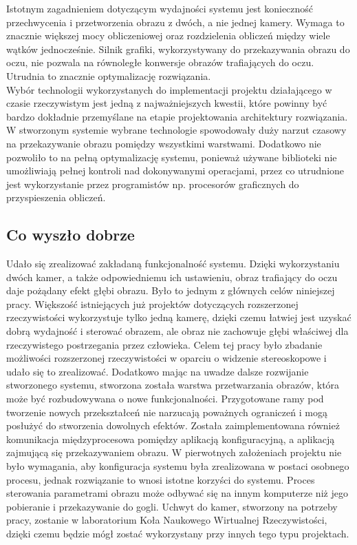 \documentclass[a4paper,11pt,twoside]{report}
\theoremstyle{definition}
\begin{document}
Istotnym zagadnieniem dotyczącym wydajności systemu jest konieczność przechwycenia i przetworzenia obrazu z dwóch, a nie jednej kamery. Wymaga to znacznie większej mocy obliczeniowej oraz rozdzielenia obliczeń między wiele wątków jednocześnie. Silnik grafiki, wykorzystywany do przekazywania obrazu do oczu, nie pozwala na równoległe konwersje obrazów trafiających do oczu. Utrudnia to znacznie optymalizację rozwiązania. \\
Wybór technologii wykorzystanych do implementacji projektu działającego w czasie rzeczywistym jest jedną z najważniejszych kwestii, które powinny być bardzo dokładnie przemyślane na etapie projektowania architektury rozwiązania. W stworzonym systemie wybrane technologie spowodowały duży narzut czasowy na przekazywanie obrazu pomiędzy wszystkimi warstwami. Dodatkowo nie pozwoliło to na pełną optymalizację systemu, ponieważ używane biblioteki nie umożliwiają pełnej kontroli nad dokonywanymi operacjami, przez co utrudnione jest wykorzystanie przez programistów np. procesorów graficznych do przyspieszenia obliczeń.

\subsection{Co wyszło dobrze}

Udało się zrealizować zakładaną funkcjonalność systemu. Dzięki wykorzystaniu dwóch kamer, a także odpowiedniemu ich ustawieniu, obraz trafiający do oczu daje pożądany efekt głębi obrazu. Było to jednym z głównych celów niniejszej pracy. Większość istniejących już projektów dotyczących rozszerzonej rzeczywistości wykorzystuje tylko jedną kamerę, dzięki czemu łatwiej jest uzyskać dobrą wydajność i sterować obrazem, ale obraz nie zachowuje głębi właściwej dla rzeczywistego postrzegania przez człowieka. Celem tej pracy było zbadanie możliwości rozszerzonej rzeczywistości w oparciu o widzenie stereoskopowe i udało się to zrealizować. Dodatkowo mając na uwadze dalsze rozwijanie stworzonego systemu, stworzona została warstwa przetwarzania obrazów, która może być rozbudowywana o nowe funkcjonalności. Przygotowane ramy pod tworzenie nowych przekształceń nie narzucają poważnych ograniczeń i mogą posłużyć do stworzenia dowolnych efektów. Została zaimplementowana również komunikacja międzyprocesowa pomiędzy aplikacją konfiguracyjną, a aplikacją zajmującą się przekazywaniem obrazu. W pierwotnych założeniach projektu nie było wymagania, aby konfiguracja systemu była zrealizowana w postaci osobnego procesu, jednak rozwiązanie to wnosi istotne korzyści do systemu. Proces sterowania parametrami obrazu może odbywać się na innym komputerze niż jego pobieranie i przekazywanie do gogli.
Uchwyt do kamer, stworzony na potrzeby pracy, zostanie w laboratorium Koła Naukowego Wirtualnej Rzeczywistości, dzięki czemu będzie mógł zostać wykorzystany przy innych tego typu projektach.
\end{document}
